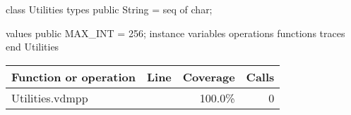 \begin{vdmpp}[breaklines=true]
class Utilities
types
 public String = seq of char;
 
values
 public MAX_INT = 256;
instance variables
operations
functions
traces
end Utilities
\end{vdmpp}
\bigskip
\begin{longtable}{|l|r|r|r|}
\hline
Function or operation & Line & Coverage & Calls \\
\hline
\hline
\hline
Utilities.vdmpp & & 100.0\% & 0 \\
\hline
\end{longtable}


